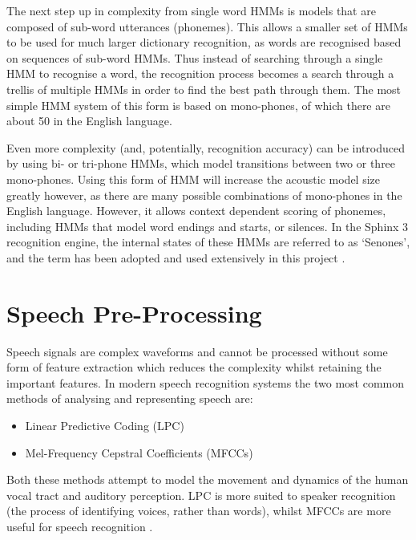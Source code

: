 		The next step up in complexity from single word HMMs is models that are composed of sub-word utterances (phonemes).  This allows a smaller set of HMMs to be used for much larger dictionary recognition, as words are recognised based on sequences of sub-word HMMs.  Thus instead of searching through a single HMM to recognise a word, the recognition process becomes a search through a trellis of multiple HMMs in order to find the best path through them.  The most simple HMM system of this form is based on mono-phones, of which there are about 50 in the English language.

		Even more complexity (and, potentially, recognition accuracy) can be introduced by using bi- or tri-phone HMMs, which model transitions between two or three mono-phones.  Using this form of HMM will increase the acoustic model size greatly however, as there are many possible combinations of mono-phones in the English language.  However, it allows context dependent scoring of phonemes, including HMMs that model word endings and starts, or silences.  In the Sphinx 3 recognition engine, the internal states of these HMMs are referred to as `Senones', and the term has been adopted and used extensively in this project \cite{sphinx}.



\section{Speech Pre-Processing} %
\label{sec:speech_pre_processing}
	Speech signals are complex waveforms and cannot be processed without some form of feature extraction which reduces the complexity whilst retaining the important features.  In modern speech recognition systems the two most common methods of analysing and representing speech are: \cite{gaikwad2010review}
	\begin{itemize}
		\item Linear Predictive Coding (LPC)
		\item Mel-Frequency Cepstral Coefficients (MFCCs)
	\end{itemize}
	Both these methods attempt to model the movement and dynamics of the human vocal tract and auditory perception.  LPC is more suited to speaker recognition (the process of identifying voices, rather than words), whilst MFCCs are more useful for speech recognition \cite{sd2012interview}.

